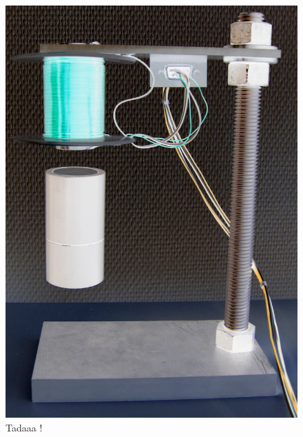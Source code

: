 \documentclass[11pt, french]{article} %
\begin{document}
\begin{figure}[h!]
	\centering
	\includegraphics[width = 12 cm]{SolutionNumerique/levitation.png} 
	\caption{Tadaaa !}
\end{figure}
 
\end{document}
